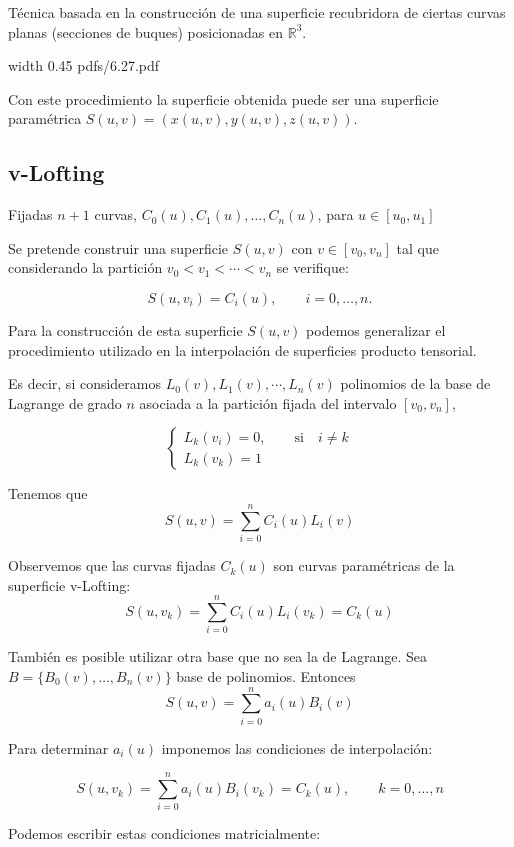 \documentclass[twoside]{report}
\newcommand{\colocapdf}[2]{\quad\pdfimage width #2 {pdfs/#1.pdf}}
\begin{document}
Técnica basada en la construcción de una superficie recubridora de ciertas curvas planas (secciones de buques) posicionadas en $\mathbb{R}^3.$

\begin{center}
\colocapdf{6.27}{0.45\textwidth}
\end{center}

Con este procedimiento la superficie obtenida puede ser una superficie paramétrica $S(u,v)=(x(u,v),y(u,v),z(u,v))$.

\subsection{v-Lofting}

Fijadas $n+1$ curvas, $C_0(u),C_1(u), \ldots, C_n(u)$,  para $u\in [u_0,u_1]$

Se pretende construir una superficie $S(u,v)$ con  $v\in [v_0,v_n]$ tal que considerando la partición $v_0<v_1<\cdots <v_n$
se verifique:

$$S(u,v_i)=C_i(u),\quad \quad i=0,\ldots,n.$$

Para la construcción de esta superficie $S(u,v)$ podemos generalizar el procedimiento utilizado en la interpolación de superficies producto tensorial.

Es decir, si consideramos $L_0(v), L_1(v), \cdots,L_n(v)$ polinomios de la base  de Lagrange de grado $n$ asociada a la partición fijada del intervalo $[v_0,v_n]$,

$$\left\{ \begin{array}{l}
L_k(v_i)=0,\quad \quad \mbox{si} \quad  i\neq k\\
L_k(v_k)=1
\end{array} \right.$$

Tenemos que
$$S(u,v)=\sum_{i=0}^n C_i(u) L_i(v)$$

Observemos que las curvas fijadas $C_k(u)$ son curvas paramétricas de la superficie v-Lofting:
$$S(u,v_k)=\sum_{i=0}^n C_i(u) L_i(v_k)=C_k(u)$$

También es posible utilizar otra base que no sea la de Lagrange. Sea  $B=\{B_0(v), \ldots,B_n(v)\}$  base de polinomios. Entonces
$$S(u,v)=\sum_{i=0}^n a_i(u) B_i(v)$$

Para determinar $a_i(u)$ imponemos las condiciones de interpolación:

$$S(u,v_k)=\sum_{i=0}^n a_i(u) B_i(v_k)=C_k(u), \quad \quad k=0,\ldots,n $$

Podemos escribir estas condiciones matricialmente:
\end{document}
